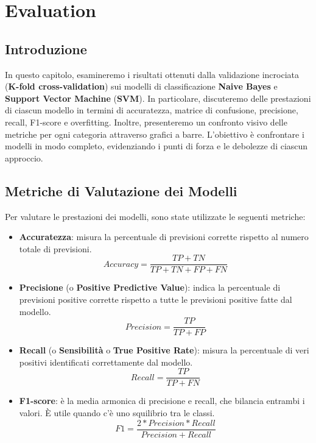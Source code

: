 \chapter{Evaluation}

\section{Introduzione}
In questo capitolo, esamineremo i risultati ottenuti dalla validazione incrociata (\textbf{K-fold cross-validation}) sui modelli di classificazione \textbf{Naive Bayes} e \textbf{Support Vector Machine} (\textbf{SVM}). In particolare, discuteremo delle prestazioni di ciascun modello in termini di accuratezza, matrice di confusione, precisione, recall, F1-score e overfitting. Inoltre, presenteremo un confronto visivo delle metriche per ogni categoria
attraverso grafici a barre. L'obiettivo è confrontare i modelli in modo completo, evidenziando i punti di forza e le debolezze di ciascun approccio.

\section{Metriche di Valutazione dei Modelli}
Per valutare le prestazioni dei modelli, sono state utilizzate le seguenti metriche:

\begin{itemize}
    \item \textbf{Accuratezza}: misura la percentuale di previsioni corrette rispetto al numero totale di previsioni.
    \begin{equation} Accuracy = \frac{TP+TN}{TP+TN+FP+FN}\end{equation}

    \item \textbf{Precisione} (o \textbf{Positive Predictive Value}): indica la percentuale di previsioni positive corrette rispetto a tutte le previsioni positive fatte dal modello.
    \begin{equation} Precision = \frac{TP}{TP+FP}\end{equation}

    \item \textbf{Recall} (o \textbf{Sensibilità} o \textbf{True Positive Rate}): misura la percentuale di veri positivi identificati correttamente dal modello.
    \begin{equation} Recall = \frac{TP}{TP+FN}\end{equation}

    \item \textbf{F1-score}: è la media armonica di precisione e recall, che bilancia entrambi i valori. È utile quando c'è uno squilibrio tra le classi.\begin{equation} F1 = \frac{2*Precision*Recall}{Precision+Recall}\end{equation}
\end{itemize}

